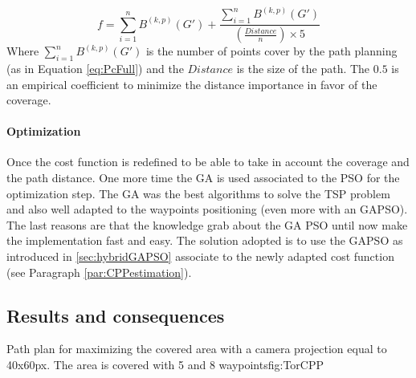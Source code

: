   \begin{equation} \label{eq:CostF2}
f=\sum_{i=1}^{n}B^{(k,p)}(G') + \frac{\sum_{i=1}^{n}B^{(k,p)}(G')}{(\frac{Distance}{n})\times 5}  
\end{equation}  %
Where $\sum_{i=1}^{n}B^{(k,p)}(G')$ is the number of points cover by the path planning (as  in  Equation \ref{eq:PcFull}) and the $Distance$  is  the size of the path. The $0.5$ is an empirical coefficient to minimize the distance importance in favor of the coverage.



\paragraph*{Optimization}
 Once the cost function is redefined to be able to take in account the coverage and the path distance.
One more time the GA is used associated to the PSO for the optimization step. %
The GA was the best algorithms to solve the TSP problem and also well adapted to the waypoints positioning (even more with an GAPSO). The last reasons are that the knowledge grab about the GA PSO until now make the implementation fast and easy.
 The solution adopted is to use the GAPSO as introduced in \ref{sec:hybridGAPSO} associate to the newly adapted cost function (see Paragraph \ref{par:CPPestimation}).


		\subsection{Results  and consequences }
\begin{mfigures}[!]{Path plan for maximizing the covered area with a camera projection  equal to 40x60px. The area is covered  with 5 and 8 waypoints}{fig:TorCPP} \centering
{}
\hspace{1cm}

\hspace{1cm}
\end{mfigures}
		
